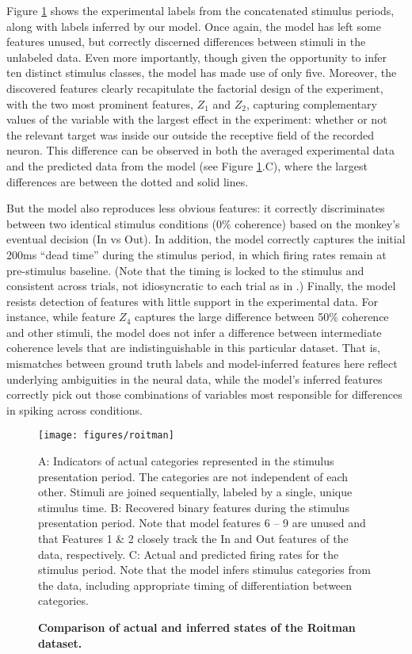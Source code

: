 \documentclass[12pt,a4paper]{article}
\begin{document}
Figure \ref{roitman} shows the experimental labels from the concatenated stimulus periods, along with labels inferred by our model. Once again, the model has left some features unused, but correctly discerned differences between stimuli in the unlabeled data. Even more importantly, though given the opportunity to infer ten distinct stimulus classes, the model has made use of only five. Moreover, the discovered features clearly recapitulate the factorial design of the experiment, with the two most prominent features, $Z_1$ and $Z_2$, capturing complementary values of the variable with the largest effect in the experiment: whether or not the relevant target was inside our outside the receptive field of the recorded neuron. This difference can be observed in both the averaged experimental data and the predicted data from the model (see Figure \ref{roitman}.C), where the largest differences are between the dotted and solid lines.

But the model also reproduces less obvious features: it correctly discriminates between two identical stimulus conditions (0\% coherence) based on the monkey's eventual decision (In vs Out). In addition, the model correctly captures the initial 200ms ``dead time'' during the stimulus period, in which firing rates remain at pre-stimulus baseline. (Note that the timing is locked to the stimulus and consistent across trials, not idiosyncratic to each trial as in \cite{Latimer2015-pb}.) Finally, the model resists detection of features with little support in the experimental data. For instance, while feature $Z_4$ captures the large difference between 50\% coherence and other stimuli, the model does not infer a difference between intermediate coherence levels that are indistinguishable in this particular dataset. That is, mismatches between ground truth labels and model-inferred features here reflect underlying ambiguities in the neural data, while the model's inferred features correctly pick out those combinations of variables most responsible for differences in spiking across conditions.

\begin{figure}[!ht]
    \texttt{[image: figures/roitman]}
	\caption{\bf Comparison of actual and inferred states of the Roitman dataset.}
	A: Indicators of actual categories represented in the stimulus presentation period. The categories are not independent of each other. Stimuli are joined sequentially, labeled by a single, unique stimulus time. B: Recovered binary features during the stimulus presentation period. Note that model features 6 -- 9 are unused and that Features 1 \& 2 closely track the In and Out features of the data, respectively. C: Actual and predicted firing rates for the stimulus period. Note that the model infers stimulus categories from the data, including appropriate timing of differentiation between categories.
	\label{roitman}
\end{figure}
\end{document}
